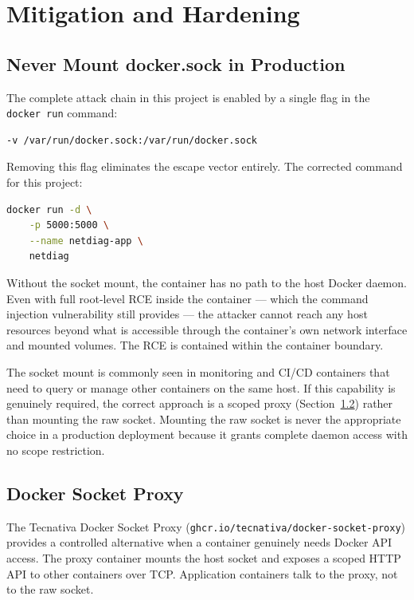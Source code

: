 \chapter{Mitigation and Hardening}

\section{Never Mount docker.sock in Production}

The complete attack chain in this project is enabled by a single flag in the \texttt{docker run} command:

\begin{lstlisting}[language=bash]
-v /var/run/docker.sock:/var/run/docker.sock
\end{lstlisting}

Removing this flag eliminates the escape vector entirely. The corrected command for this project:

\begin{lstlisting}[language=bash]
docker run -d \
    -p 5000:5000 \
    --name netdiag-app \
    netdiag
\end{lstlisting}

Without the socket mount, the container has no path to the host Docker daemon. Even with full root-level RCE inside the container --- which the command injection vulnerability still provides --- the attacker cannot reach any host resources beyond what is accessible through the container's own network interface and mounted volumes. The RCE is contained within the container boundary.

The socket mount is commonly seen in monitoring and CI/CD containers that need to query or manage other containers on the same host. If this capability is genuinely required, the correct approach is a scoped proxy (Section~\ref{sec:socket-proxy}) rather than mounting the raw socket. Mounting the raw socket is never the appropriate choice in a production deployment because it grants complete daemon access with no scope restriction.


\section{Docker Socket Proxy}
\label{sec:socket-proxy}

The Tecnativa Docker Socket Proxy (\texttt{ghcr.io/tecnativa/docker-socket-proxy}) provides a controlled alternative when a container genuinely needs Docker API access. The proxy container mounts the host socket and exposes a scoped HTTP API to other containers over TCP. Application containers talk to the proxy, not to the raw socket.

